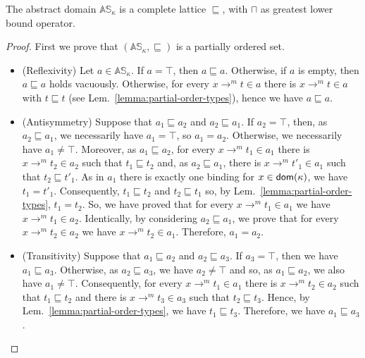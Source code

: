 \begin{proposition}\label{prop:complete_lattice}
  The abstract domain $\mathbb{AS}_\kappa$ is a complete lattice \wrt $\sqsubseteq$,
  with $\sqcap$ as greatest lower bound operator.
\end{proposition}
\begin{proof}
  First we prove that $(\mathbb{AS}_\kappa,\sqsubseteq)$ is a partially
  ordered set.
  \begin{itemize}
    \item (Reflexivity) Let $a\in\mathbb{AS}_\kappa$. If $a=\top$, then
    $a\sqsubseteq a$. Otherwise, if $a$ is empty, then $a\sqsubseteq a$ holds
    vacuously. Otherwise, for every $x\to^mt\in a$ there is $x\to^mt\in a$ with
    $t\sqsubseteq t$ (see Lem.~\ref{lemma:partial-order-types}), hence we have
    $a\sqsubseteq a$.
    \item (Antisymmetry) Suppose that $a_1 \sqsubseteq a_2$ and
    $a_2 \sqsubseteq a_1$. If $a_2=\top$, then, as $a_2 \sqsubseteq a_1$,
    we necessarily have $a_1=\top$, so $a_1=a_2$. Otherwise, we necessarily
    have $a_1\neq\top$. Moreover, as $a_1 \sqsubseteq a_2$, for every
    $x\to^mt_1\in a_1$ there is $x\to^mt_2\in a_2$ such that
    $t_1\sqsubseteq t_2$ and, as $a_2 \sqsubseteq a_1$, there is
    $x\to^mt'_1\in a_1$ such that $t_2\sqsubseteq t'_1$.
    As in $a_1$ there is exactly one binding for $x\in\mathsf{dom}(\kappa)$, we have
    $t_1=t'_1$. Consequently, $t_1\sqsubseteq t_2$ and $t_2\sqsubseteq t_1$
    so, by Lem.~\ref{lemma:partial-order-types}, $t_1=t_2$. So, we have
    proved that for every $x\to^mt_1\in a_1$ we have $x\to^mt_1\in a_2$.
    Identically, by considering $a_2 \sqsubseteq a_1$, we prove that
    for every $x\to^mt_2\in a_2$ we have $x\to^mt_2\in a_1$.
    Therefore, $a_1=a_2$.
    \item (Transitivity) Suppose that $a_1 \sqsubseteq a_2$ and
    $a_2 \sqsubseteq a_3$. If $a_3=\top$, then we have $a_1\sqsubseteq a_3$.
    Otherwise, as $a_2 \sqsubseteq a_3$, we have $a_2\neq\top$ and so, as
    $a_1 \sqsubseteq a_2$, we also have $a_1\neq\top$. Consequently, for every
    $x\to^mt_1\in a_1$ there is $x\to^mt_2\in a_2$ such that
    $t_1\sqsubseteq t_2$ and there is $x\to^mt_3\in a_3$ such that
    $t_2\sqsubseteq t_3$. Hence, by Lem.~\ref{lemma:partial-order-types},
    we have $t_1\sqsubseteq t_3$. Therefore, we have $a_1\sqsubseteq a_3$.
  \end{itemize}


\end{proof}
